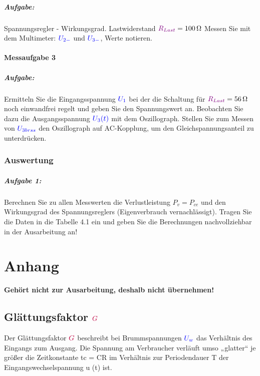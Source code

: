 \documentclass[11pt,a4paper,titlepage]{scrreprt}
\begin{document}
            \paragraph{Aufgabe:} Spannungsregler - Wirkungsgrad. Lastwiderstand $\textcolor{violet}{R_{Last}} = \SI{100}{\ohm}$ Messen Sie mit dem  Multimeter: $\textcolor{blue}{U_{2-}}$ und $\textcolor{blue}{U_{3-}}$, Werte notieren.
            
            \subsubsection{Messaufgabe 3}
            \paragraph{Aufgabe:}  Ermitteln Sie die Eingangsspannung $\textcolor{blue}{U_1}$ bei der die Schaltung für $\textcolor{violet}{R_{Last}} = \SI{56}{\ohm}$ noch einwandfrei regelt und geben Sie den Spannungswert an. Beobachten Sie dazu die Ausgangsspannung $\textcolor{blue}{U_3(t)}$ mit dem Oszillograph. Stellen Sie zum Messen von $\textcolor{blue}{U_{3brss}}$ den Oszillograph auf AC-Kopplung, um den Gleichspannungsanteil zu unterdrücken.
            
            \subsection{Auswertung}
        	\paragraph{Aufgabe 1: }  Berechnen Sie zu allen Messwerten die Verlustleistung $P_v = P_{ce}$ und den Wirkungsgrad des Spannungsreglers (Eigenverbrauch vernachlässigt). Tragen Sie die Daten in die Tabelle 4.1 ein und geben Sie die Berechnungen nachvollziehbar in der Ausarbeitung an!
            
           \listoftables
           
           
           \chapter{Anhang}
           \textbf{Gehört nicht zur Ausarbeitung, deshalb nicht übernehmen!}
           
           \section{Glättungsfaktor $\textcolor{purple}{G}$}
           Der Glättungsfaktor  $\textcolor{purple}{G}$ beschreibt bei Brummspannungen $\textcolor{blue}{U_w}$ das Verhältnis des Eingangs zum Ausgang. Die Spannung am Verbraucher verläuft umso „glatter“ je größer die Zeitkonstante tc = CR im Verhältnis zur Periodendauer T der Eingangswechselspannung u (t) ist.
           
\end{document}
